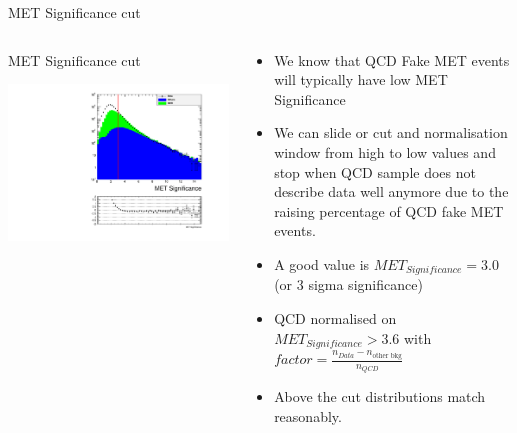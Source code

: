\documentclass[8pt]{beamer}
\begin{document}
\begin{frame}{MET Significance cut}

\begin{columns}
 
\begin{block}{MET Significance cut}
 
\includegraphics[width=\linewidth]{img/DEta3p6/metSig_LogY.pdf}

\end{block}

\begin{block}
 
\begin{itemize}
  \item We know that QCD Fake MET events will typically have low MET Significance
  \item We can slide or cut and normalisation window from high to low values and stop when QCD sample does not describe data well anymore due to the raising percentage of QCD fake MET events.
  \item A good value is $MET_{Significance} = 3.0$ (or 3 sigma significance)
  \item QCD normalised on $MET_{Significance}>3.6$ with $factor = \frac{n_{Data}-n_{\text{other bkg}}}{n_{QCD}}$
  \item Above the cut distributions match reasonably.
\end{itemize}

\end{block}

\end{columns}

\end{frame}
\end{document}
